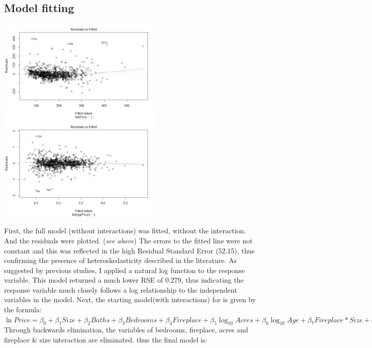 \documentclass[10pt,A4,makeidx]{article}
\begin{document}
  \subsection{Model fitting}
  \begin{center}
    \includegraphics[width=8cm]{full-res.png}
    \includegraphics[width=8cm]{full-resln.png}
  \end{center}
  First, the full model (without interactions) was fitted, without the interaction. And the residuals were plotted. (\emph{see above})
  The errors to the fitted line were not constant and this was reflected in the high Residual Standard Error
  (52.15), thus confirming the presence of heteroskedasticity described in the literature.
  As suggested by previous studies, I applied a natural log function to the response variable.
  This model returned a much lower RSE of 0.279, thus indicating the response variable
  much closely follows a log relationship to the independent variables in the model.
  Next, the  starting model(with interactions) for is given by the formula:\\

  \(\ln Price = \beta _0 + \beta _1 Size + \beta _2 Baths + \beta _3 Bedrooms + \beta _4 Fireplace + \beta _5 \log_{10}Acres + \beta _6 \log_{10}Age + \beta _7 Fireplace*Size + \varepsilon\)\\

  Through backwards elimination, the variables of bedrooms, fireplace, acres and
  fireplace \& size interaction are eliminated. thus the final model is:\\
  
\end{document}
